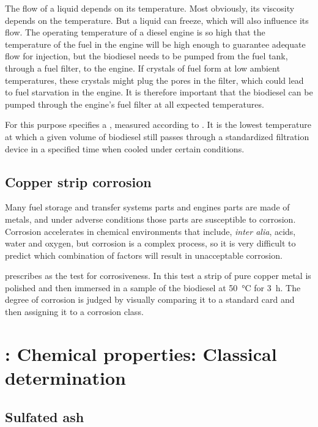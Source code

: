 The flow of a liquid depends on its temperature. Most obviously, its viscosity
depends on the temperature. But a liquid can freeze, which will also influence
its flow. The operating temperature of a diesel engine is so high that the
temperature of the fuel in the engine will be high enough to guarantee adequate
flow for injection, but the biodiesel needs to be pumped from the fuel tank,
through a fuel filter, to the engine. If crystals of fuel form at low ambient
temperatures, these crystals might plug the pores in the filter, which could
lead to fuel starvation in the engine. It is therefore important that the
biodiesel can be pumped through the engine's fuel filter at all expected
temperatures.

For this purpose  specifies a , measured according to . It is the lowest temperature at
which a given volume of biodiesel still passes through a standardized filtration
device in a specified time when cooled under certain conditions.

\subsection{Copper strip corrosion}

Many fuel storage  and transfer systems parts and engines parts are made of
metals, and under adverse conditions those parts are susceptible to corrosion.
Corrosion accelerates in chemical environments that include, \textit{inter
alia}, acids, water and oxygen, but corrosion is a complex process, so it is
very difficult to predict which combination of factors will result in
unacceptable corrosion.

 prescribes  as the test for corrosiveness. In this
test a strip of pure copper metal is polished and then immersed in a sample of
the biodiesel at \SI{50}{\celsius} for \SI{3}{\hour}. The degree of corrosion is
judged by visually comparing it to a standard card and then assigning it to a
corrosion class.

\section{\texorpdfstring{}{SANS 1935}: Chemical properties: Classical determination}

\subsection{Sulfated ash}

